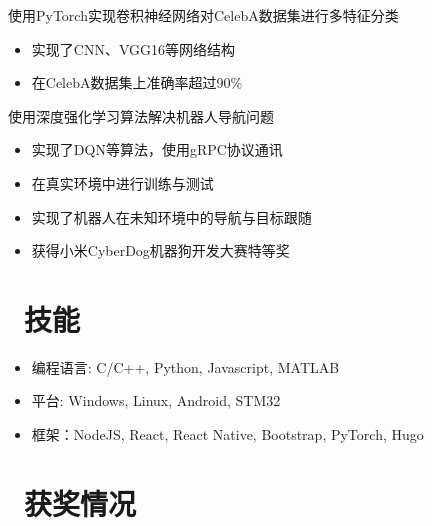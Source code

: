 \documentclass{resume}
\begin{document}
\begin{onehalfspacing}
使用PyTorch实现卷积神经网络对CelebA数据集进行多特征分类
\begin{itemize}
  \item 实现了CNN、VGG16等网络结构
  \item 在CelebA数据集上准确率超过90\%
\end{itemize}
\end{onehalfspacing}

\begin{onehalfspacing}
使用深度强化学习算法解决机器人导航问题
\begin{itemize}
  \item 实现了DQN等算法，使用gRPC协议通讯
  \item 在真实环境中进行训练与测试
  \item 实现了机器人在未知环境中的导航与目标跟随
  \item 获得小米CyberDog机器狗开发大赛特等奖
\end{itemize}
\end{onehalfspacing}


\section{\faCogs\ 技能}
\begin{itemize}[parsep=0.5ex]
  \item 编程语言: C/C++, Python, Javascript, MATLAB
  \item 平台: Windows, Linux, Android, STM32
  \item 框架：NodeJS, React, React Native, Bootstrap, PyTorch, Hugo
\end{itemize}

\section{\faHeartO\ 获奖情况}
\end{document}
